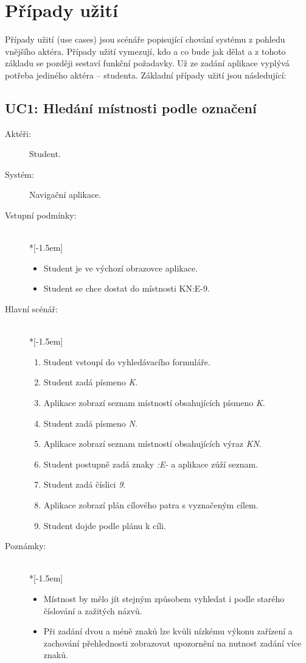 \section{Případy užití}
Případy užití (use cases) jsou scénáře popisující chování systému z pohledu vnějšího aktéra. Případy užití vymezují, kdo a co bude jak dělat a z tohoto základu se později sestaví funkční požadavky. Už ze zadání aplikace vyplývá potřeba jediného aktéra -- studenta. Základní případy užití jsou následující:
\subsection{UC1: Hledání místnosti podle označení}
\label{ssec:UChledaniMistnosti}
\begin{description}
\item[Aktéři:] Student.
\item[Systém:] Navigační aplikace.
\item[Vstupní podmínky:] ~\\*[-1.5em]
 \begin{itemize}
 \item Student je ve výchozí obrazovce aplikace.
 \item Student se chce dostat do místnosti KN:E-9.
 \end{itemize}
\pagebreak
\item[Hlavní scénář:] ~\\*[-1.5em]
 \begin{enumerate}
 \item Student vstoupí do vyhledávacího formuláře.
 \item Student zadá písmeno \emph{K}.
 \item Aplikace zobrazí seznam místností obsahujících písmeno \emph{K}.
 \item Student zadá písmeno \emph{N}.
 \item Aplikace zobrazí seznam místností obsahujících výraz \emph{KN}.
 \item Student postupně zadá znaky \emph{:E-} a aplikace zúží seznam.
 \item Student zadá číslici \emph{9}.
 \item Aplikace zobrazí plán cílového patra s vyznačeným cílem.
 \item Student dojde podle plánu k cíli.
 \end{enumerate}
\item[Poznámky:] ~\\*[-1.5em]
 \begin{itemize}
 \item Místnost by mělo jít stejným způsobem vyhledat i podle starého číslování a zažitých názvů.
 \item Při zadání dvou a méně znaků lze kvůli nízkému výkonu zařízení a zachování přehlednosti zobrazovat upozornění na nutnost zadání více znaků.
 \end{itemize}
\end{description}

